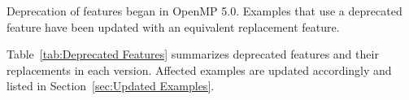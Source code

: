 \label{chap:deprecated_features}
\label{sec:deprecated_features}

\newcommand\tabpcont[1]{\multicolumn{2}{l}{\small\slshape table continued #1 page}}
\newcommand\tabpheader{\textbf{Version} & \textbf{Deprecated Feature} &
  \textbf{Replacement}}
\newcommand\tabuheader{\textbf{Example Name} & \textbf{Earlier Version} &
  \textbf{Feature Updated}}
\newcommand\dpftable[1]{
  \renewcommand{\arraystretch}{1.0}
  \tablefirsthead{%
    \hline\\[-2ex]
    \tabuheader\\[2pt]
    \hline\\[-2ex]
  }
  \tablehead{%
    \tabpcont{from previous}\\[2pt]
    \hline\\[-2ex]
    \tabuheader\\[2pt]
    \hline\\[-2ex]
  }
  \tabletail{%
    \hline\\[-2.5ex]
    \tabpcont{on next}\\
  }
  \tablelasttail{\hline\\[-1ex]}
  \tablecaption{Updated Examples for Features Deprecated in Version #1\label{tab:Updated Examples #1}}
}


Deprecation of features began in OpenMP 5.0. 
Examples that use a deprecated feature have been updated with an equivalent 
replacement feature.  

Table~\ref{tab:Deprecated Features} summarizes deprecated features and 
their replacements in each version.  Affected examples are updated 
accordingly and listed in Section~\ref{sec:Updated Examples}.


